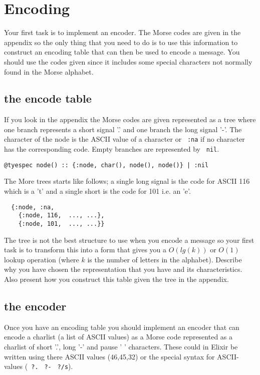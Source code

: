\documentclass[a4paper,11pt]{article}
\begin{document}
\section*{Encoding}

Your first task is to implement an encoder. The Morse codes are given
in the appendix so the only thing that you need to do is to use this
information to construct an encoding table that can then be used to
encode a message. You should use the codes given since it includes some
special characters not normally found in the Morse alphabet.

\subsection{the encode table}

If you look in the appendix the Morse codes are given represented as a
tree where one branch represents a short signal '.' and one branch the
long signal '-'.  The character of the node is the ASCII value of a
character or \verb+ :na+ if no character has the corresponding
code. Empty branches are represented by \verb+ nil+.

\begin{verbatim}
@tyespec node() :: {:node, char(), node(), node()} | :nil
\end{verbatim}

The More trees starts like follows; a single long signal is the code
for ASCII 116 which is a 't' and a single short is the code for 101
i.e. an 'e'.

\begin{verbatim}
  {:node, :na,
    {:node, 116,  ..., ...},
    {:node, 101,  ..., ...}}
\end{verbatim}

The tree is not the best structure to use when you encode a message so
your first task is to transform this into a form that gives you a
$O(lg(k))$ or $O(1)$ lookup operation (where $k$ is the number of
letters in the alphabet). Describe why you have chosen the
representation that you have and its characteristics. Also present how
you construct this table given the tree in the appendix.

\subsection*{the encoder}

Once you have an encoding table you should implement an encoder that
can encode a charlist (a list of ASCII values) as a Morse code
represented as a charlist of short '.', long '-' and pause ' '
characters. These could in Elixir be written using there ASCII values
(46,45,32) or the special syntax for ASCII-values (\verb+ ?.+
\verb+ ?-+ \verb+ ?/s+). 
\end{document}
